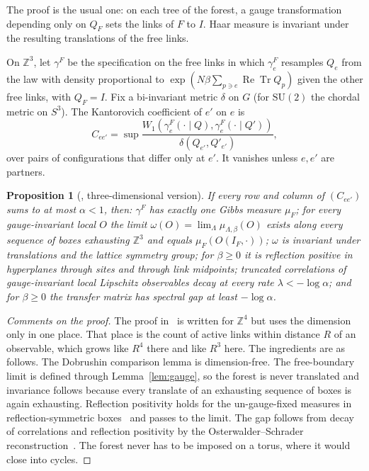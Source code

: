 \documentclass[11pt]{amsart}
\newtheorem{proposition}[theorem]{Proposition}
\theoremstyle{definition}
\theoremstyle{remark}
\newcommand{\Tr}{\operatorname{Tr}}
\renewcommand{\Re}{\operatorname{Re}}
\newcommand{\SU}{\mathrm{SU}}
\newcommand{\Z}{\mathbb{Z}}
\begin{document}
The proof is the usual one: on each tree of the forest, a gauge transformation depending only on $Q_F$ sets the
links of $F$ to $I$. Haar measure is invariant under the resulting translations of the free links.

On $\Z^3$, let $\gamma^F$ be the specification on the free links in which $\gamma^F_e$ resamples $Q_e$ from the law
with density proportional to $\exp(N\beta\sum_{p\ni e}\Re\Tr Q_p)$ given the other free links, with $Q_F=I$. Fix a
bi-invariant metric $\delta$ on $G$ (for $\SU(2)$ the chordal metric on $S^3$). The Kantorovich coefficient of $e'$
on $e$ is
\[
C_{ee'}=\sup\frac{W_1(\gamma^F_e(\cdot\mid Q),\gamma^F_e(\cdot\mid Q'))}{\delta(Q_{e'},Q'_{e'})},
\]
over pairs of configurations that differ only at $e'$. It vanishes unless $e,e'$ are partners.

\begin{proposition}[{\cite[Prop.~11]{BBL}}, three-dimensional version]\label{prop:state}
If every row and column of $(C_{ee'})$ sums to at most $\alpha<1$, then: $\gamma^F$ has exactly one Gibbs measure
$\mu_F$; for every gauge-invariant local $O$ the limit $\omega(O)=\lim_\Lambda\mu_{\Lambda,\beta}(O)$ exists along every
sequence of boxes exhausting $\Z^3$ and equals $\mu_F(O(I_F,\cdot))$; $\omega$ is invariant under translations and
the lattice symmetry group; for $\beta\ge0$ it is reflection positive in hyperplanes through sites and through link
midpoints; truncated correlations of gauge-invariant local Lipschitz observables decay at every rate
$\lambda<-\log\alpha$; and for $\beta\ge0$ the transfer matrix has spectral gap at least $-\log\alpha$.
\end{proposition}

\begin{proof}[Comments on the proof]
The proof in~\cite{BBL} is written for $\Z^4$ but uses the dimension only in one place. That place is the count of
active links within distance $R$ of an observable, which grows like $R^4$ there and like $R^3$ here. The ingredients
are as follows. The Dobrushin comparison lemma is dimension-free. The free-boundary limit is defined through
Lemma~\ref{lem:gauge}, so the forest is never translated and invariance follows because every translate of an
exhausting sequence of boxes is again exhausting. Reflection positivity holds for the un-gauge-fixed measures in
reflection-symmetric boxes~\cite{OS} and passes to the limit. The gap follows from decay of correlations and
reflection positivity by the Osterwalder--Schrader reconstruction~\cite{OS}. The forest never has to be imposed on a
torus, where it would close into cycles.
\end{proof}
\end{document}
